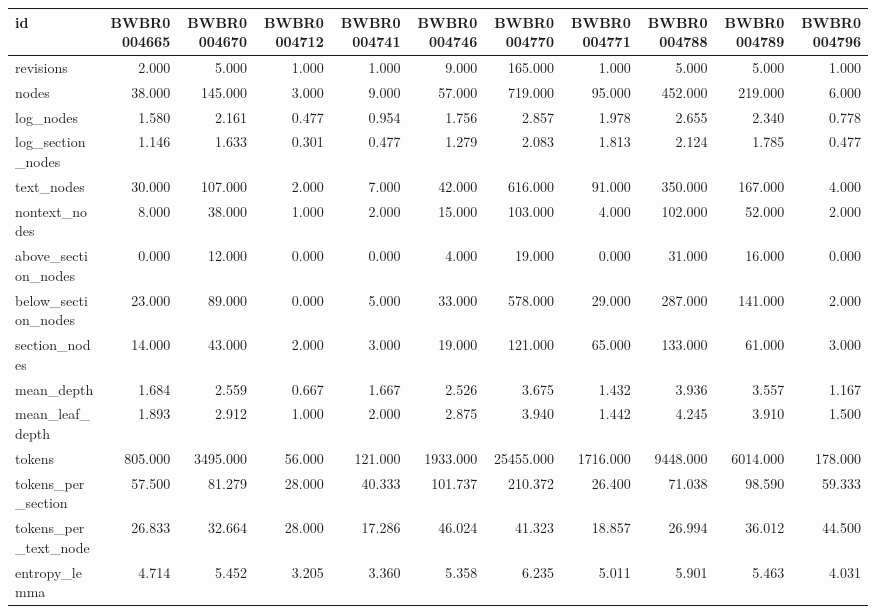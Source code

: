 \begin{tabular}{lrrrrrrrrrr}
\toprule
id & BWBR0004665 & BWBR0004670 & BWBR0004712 & BWBR0004741 & BWBR0004746 & BWBR0004770 & BWBR0004771 & BWBR0004788 & BWBR0004789 & BWBR0004796 \\
\midrule
revisions & 2.000 & 5.000 & 1.000 & 1.000 & 9.000 & 165.000 & 1.000 & 5.000 & 5.000 & 1.000 \\
\cline{1-11}
nodes & 38.000 & 145.000 & 3.000 & 9.000 & 57.000 & 719.000 & 95.000 & 452.000 & 219.000 & 6.000 \\
\cline{1-11}
log\_nodes & 1.580 & 2.161 & 0.477 & 0.954 & 1.756 & 2.857 & 1.978 & 2.655 & 2.340 & 0.778 \\
\cline{1-11}
log\_section\_nodes & 1.146 & 1.633 & 0.301 & 0.477 & 1.279 & 2.083 & 1.813 & 2.124 & 1.785 & 0.477 \\
\cline{1-11}
text\_nodes & 30.000 & 107.000 & 2.000 & 7.000 & 42.000 & 616.000 & 91.000 & 350.000 & 167.000 & 4.000 \\
\cline{1-11}
nontext\_nodes & 8.000 & 38.000 & 1.000 & 2.000 & 15.000 & 103.000 & 4.000 & 102.000 & 52.000 & 2.000 \\
\cline{1-11}
above\_section\_nodes & 0.000 & 12.000 & 0.000 & 0.000 & 4.000 & 19.000 & 0.000 & 31.000 & 16.000 & 0.000 \\
\cline{1-11}
below\_section\_nodes & 23.000 & 89.000 & 0.000 & 5.000 & 33.000 & 578.000 & 29.000 & 287.000 & 141.000 & 2.000 \\
\cline{1-11}
section\_nodes & 14.000 & 43.000 & 2.000 & 3.000 & 19.000 & 121.000 & 65.000 & 133.000 & 61.000 & 3.000 \\
\cline{1-11}
mean\_depth & 1.684 & 2.559 & 0.667 & 1.667 & 2.526 & 3.675 & 1.432 & 3.936 & 3.557 & 1.167 \\
\cline{1-11}
mean\_leaf\_depth & 1.893 & 2.912 & 1.000 & 2.000 & 2.875 & 3.940 & 1.442 & 4.245 & 3.910 & 1.500 \\
\cline{1-11}
tokens & 805.000 & 3495.000 & 56.000 & 121.000 & 1933.000 & 25455.000 & 1716.000 & 9448.000 & 6014.000 & 178.000 \\
\cline{1-11}
tokens\_per\_section & 57.500 & 81.279 & 28.000 & 40.333 & 101.737 & 210.372 & 26.400 & 71.038 & 98.590 & 59.333 \\
\cline{1-11}
tokens\_per\_text\_node & 26.833 & 32.664 & 28.000 & 17.286 & 46.024 & 41.323 & 18.857 & 26.994 & 36.012 & 44.500 \\
\cline{1-11}
entropy\_lemma & 4.714 & 5.452 & 3.205 & 3.360 & 5.358 & 6.235 & 5.011 & 5.901 & 5.463 & 4.031 \\

\end{tabular}

